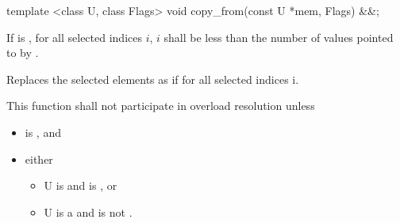 \begin{itemdecl}
template <class U, class Flags> void copy_from(const U *mem, Flags) &&;
\end{itemdecl}
\begin{itemdescr}
  If  is \true, for all selected indices $i$, $i$ shall be less than the number of values pointed to by .

  \pnum\effects Replaces the selected elements as if  for all selected indices \code i.

  \pnum\remarks This function shall not participate in overload resolution unless
  \begin{itemize}
      \item {} is \true, and
      \item either
          \begin{itemize}
              \item \type U is \bool and  is \bool, or
              \item \type U is a \realArithmeticType and  is not \bool.
          \end{itemize}
  \end{itemize}
\end{itemdescr}


